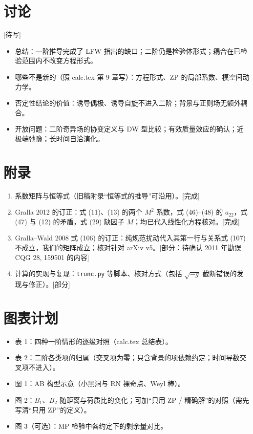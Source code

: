 \documentclass[11pt,a4paper]{ctexart}
\newcommand{\status}[1]{\hfill{\small\color{blue!50!black}[#1]}}
\begin{document}
\section{讨论}\label{sec:o-disc}
\status{待写}
\begin{itemize}[nosep]
\item 总结：一阶推导完成了 LFW 指出的缺口；二阶仍是检验体形式；耦合在已检验范围内不改变方程形式。
\item 哪些不是新的（照 calc.tex 第 9 章写）：方程形式、ZP 的局部系数、模空间动力学。
\item 否定性结论的价值：诱导偶极、诱导自旋不进入二阶；背景与正则场无额外耦合。
\item 开放问题：二阶奇异场的协变定义与 DW 型比较；有效质量效应的确认；近极端弛豫；长时间自洽演化。
\end{itemize}

\section*{附录}
\begin{enumerate}[label=\Alph*.,nosep]
\item 系数矩阵与恒等式（旧稿附录“恒等式的推导”可沿用）。\status{完成}
\item Gralla 2012 的订正：式 (11)、(13) 的两个 $M^2$ 系数，式 (46)--(48) 的 $a_{22}$，式 (47) 与 (12) 的矛盾，式 (29) 缺因子 $M$；均已代入线性化方程核对。\status{完成}
\item Gralla--Wald 2008 式 (106) 的订正：纯规范扰动代入其第一行与关系式 (107) 不成立，我们的矩阵成立；核对针对 arXiv v5。\status{部分：待确认 2011 年勘误 CQG 28, 159501 的内容}
\item 计算的实现与复现：\texttt{trunc.py} 等脚本、核对方式（包括 $\sqrt{-g}$ 截断错误的发现与修正）。\status{部分}
\end{enumerate}

\section*{图表计划}
\begin{itemize}[nosep]
\item 表 1：四种一阶情形的逐级对照（calc.tex 总结表）。
\item 表 2：二阶各类项的归属（交叉项为零；只含背景的项依赖约定；时间导数交叉项不进入）。
\item 图 1：AB 构型示意（小黑洞与 RN 裸奇点、Weyl 棒）。
\item 图 2：$B_1$、$B_2$ 随距离与荷质比的变化；可加“只用 ZP / 精确解”的对照（需先写清“只用 ZP”的定义）。
\item 图 3（可选）：MP 检验中各约定下的剩余量对比。
\end{itemize}
\end{document}
